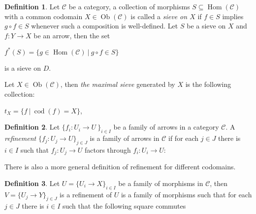 \documentclass[8pt]{article}
\theoremstyle{definition}
\newtheorem{definition}{Definition}[section]
\theoremstyle{definition}
\theoremstyle{definition}
\theoremstyle{definition}
\theoremstyle{definition}
\theoremstyle{definition}
\theoremstyle{definition}
\theoremstyle{definition}
\theoremstyle{definition}
\theoremstyle{definition}
\theoremstyle{definition}
\theoremstyle{definition}
\theoremstyle{definition}
\theoremstyle{question}
\newcommand{\Ob}[1]{\operatorname{Ob}({\mathcal{#1}})}
\begin{document}
\begin{definition}
Let $\mathcal{C}$ be a category, a collection of morphisms $S \subseteq \operatorname{Hom}(\mathcal{C})$ with a common
codomain $X \in \Ob{C}$ is called a \emph{sieve on $X$} if $f \in S$ implies $g \circ f \in S$ whenever such a composition is well-defined.
Let $S$ be a sieve on $X$ and $f : Y \to X$ be an arrow, then the set
\begin{center}
  $f^*(S) = \{ g \in \operatorname{Hom}(\mathcal{C}) \: | \: g \circ f \in S \}$
\end{center}
is a sieve on $D$.

Let $X \in \Ob{C}$, then \emph{the maximal sieve} generated by $X$ is the following collection:
\begin{center}
  $t_X = \{ f \: | \: \operatorname{cod}(f) = X \}$,
\end{center}
\end{definition}

\begin{definition}
  Let $\{ f_i : U_i \to U \: \}_{i \in I}$ be a family of arrows in a category $\mathcal{C}$.
  A \emph{refinement} $\{ f_j : U_j \to U \}_{j \in J}$ is a family of arrows in $\mathcal{C}$
  if for each $j \in J$ there is $i \in I$ such that $f_j :  U_j \to U$ factors through $f_i : U_i \to U$:
  
  \centerline{
    }
\end{definition}

There is also a more general definition of refinement for different codomains.
\begin{definition}
  Let $U = \{ U_i \to X \}_{i \in I}$ be a family of morphisms in $\mathcal{C}$,
  then $V = \{ U_j \to Y\}_{j \in J}$ is a refinement of $U$ is a family of morphisms
  such that for each $j \in J$ there is $i \in I$ such that the following square commutes


  \centerline{
  }
\end{definition} 
\end{document}
